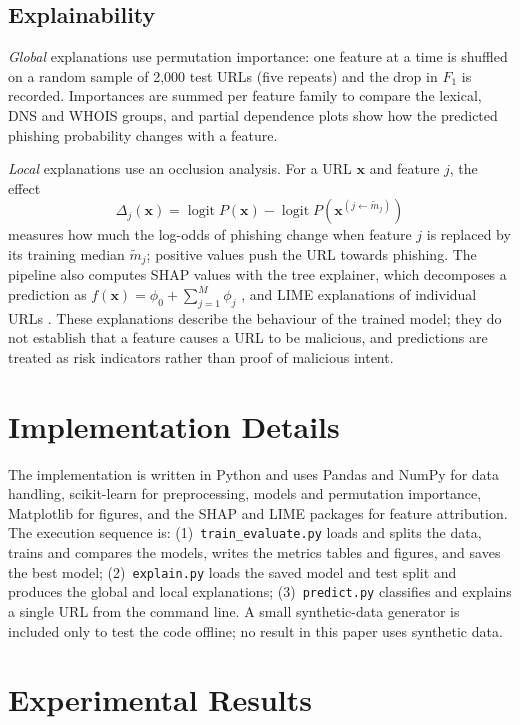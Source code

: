 \documentclass[journal]{IEEEtran}
\begin{document}
\subsection{Explainability}
\emph{Global} explanations use permutation importance: one feature at a time is shuffled on a random sample of 2,000 test URLs (five repeats) and the drop in $F_1$ is recorded. Importances are summed per feature family to compare the lexical, DNS and WHOIS groups, and partial dependence plots show how the predicted phishing probability changes with a feature.

\emph{Local} explanations use an occlusion analysis. For a URL $\mathbf{x}$ and feature $j$, the effect
\begin{equation}
\Delta_j(\mathbf{x}) = \operatorname{logit} P(\mathbf{x}) - \operatorname{logit} P(\mathbf{x}^{(j\leftarrow \tilde{m}_j)})
\end{equation}
measures how much the log-odds of phishing change when feature $j$ is replaced by its training median $\tilde{m}_j$; positive values push the URL towards phishing. The pipeline also computes SHAP values with the tree explainer, which decomposes a prediction as $f(\mathbf{x})=\phi_0+\sum_{j=1}^{M}\phi_j$ \cite{lundberg2017unified}, and LIME explanations of individual URLs \cite{ribeiro2016why}. These explanations describe the behaviour of the trained model; they do not establish that a feature causes a URL to be malicious, and predictions are treated as risk indicators rather than proof of malicious intent.

\section{Implementation Details}
The implementation is written in Python and uses Pandas and NumPy for data handling, scikit-learn for preprocessing, models and permutation importance, Matplotlib for figures, and the SHAP and LIME packages for feature attribution. The execution sequence is: (1)~\texttt{train\_evaluate.py} loads and splits the data, trains and compares the models, writes the metrics tables and figures, and saves the best model; (2)~\texttt{explain.py} loads the saved model and test split and produces the global and local explanations; (3)~\texttt{predict.py} classifies and explains a single URL from the command line. A small synthetic-data generator is included only to test the code offline; no result in this paper uses synthetic data.

\section{Experimental Results}\label{sec:results}
\end{document}
